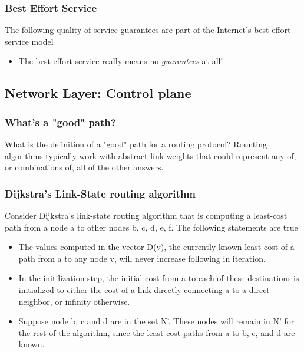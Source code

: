    \subsubsection*{Best Effort Service}
    \noindent The following quality-of-service guarantees are part of the Internet's best-effort service model
    \begin{itemize}
        \item The best-effort service really means no \textit{guarantees} at all!
    \end{itemize}

\subsection*{Network Layer: Control plane}
    \subsubsection*{What's a "good" path?}
    \noindent What is the definition of a "good" path for a routing protocol?
    Rounting algorithms typically work with abstract link weights that could represent any of, or combinations of, all of the other answers.

    \subsubsection*{Dijkstra's Link-State routing algorithm}
    \noindent Consider Dijkstra's link-state routing algorithm that is computing a least-cost path from a node a to other nodes b, c, d, e, f. The following
    statements are true
    \begin{itemize}
        \item The values computed in the vector D(v), the currently known least cost of a path from a to any node v, will never increase following in iteration.
        \item In the initilization step, the initial cost from a to each of these destinations is initialized to either the cost of a link directly connecting
        a to a direct neighbor, or infinity otherwise.
        \item Suppose node b, c and d are in the set N'. These nodes will remain in N' for the rest of the algorithm, since the least-cost paths from a to b, c,
        and d are known.
    \end{itemize}

